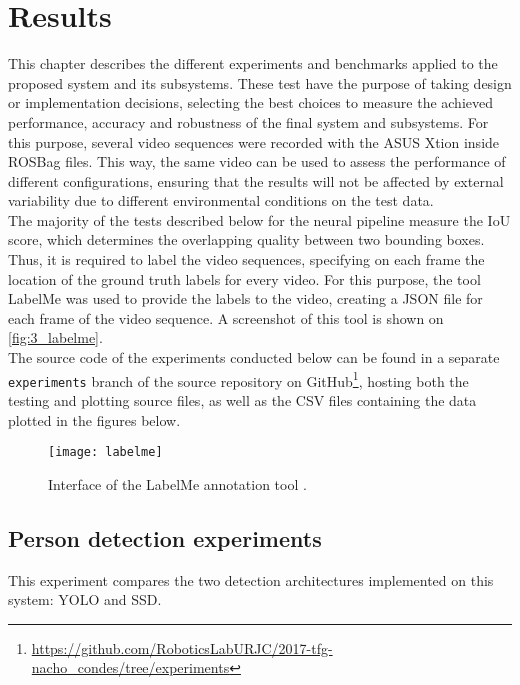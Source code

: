 \chapter{Results}
\label{chap:3_results}

This chapter describes the different experiments and benchmarks applied to the proposed system and its subsystems. These test have the purpose of taking design or implementation decisions, selecting the best choices to measure the achieved performance, accuracy and robustness of the final system and subsystems. For this purpose, several video sequences were recorded with the ASUS Xtion inside ROSBag files. This way, the same video can be used to assess the performance of different configurations, ensuring that the results will not be affected by external variability due to different environmental conditions on the test data.\\

The majority of the tests described below for the neural pipeline measure the IoU score, which determines the overlapping quality between two bounding boxes. Thus, it is required to label the video sequences, specifying on each frame the location of the ground truth labels for every video. For this purpose, the tool LabelMe \cite{labelme} was used to provide the labels to the video, creating a JSON file for each frame of the video sequence. A screenshot of this tool is shown on \autoref{fig:3_labelme}.\\

The source code of the experiments conducted below can be found in a separate \texttt{experiments} branch of the source repository on GitHub\footnote{\url{https://github.com/RoboticsLabURJC/2017-tfg-nacho_condes/tree/experiments}}, hosting both the testing and plotting source files, as well as the CSV files containing the data plotted in the figures below.


\begin{figure}[h]
	\centering
	\texttt{[image: labelme]}
	\caption{Interface of the LabelMe annotation tool \cite{labelme}.}
	\label{fig:3_labelme}
\end{figure}


\section{Person detection experiments}
\label{sec:3_test1}
This experiment compares the two detection architectures implemented on this system: YOLO \cite{yolov3} and SSD\cite{ssd}.

